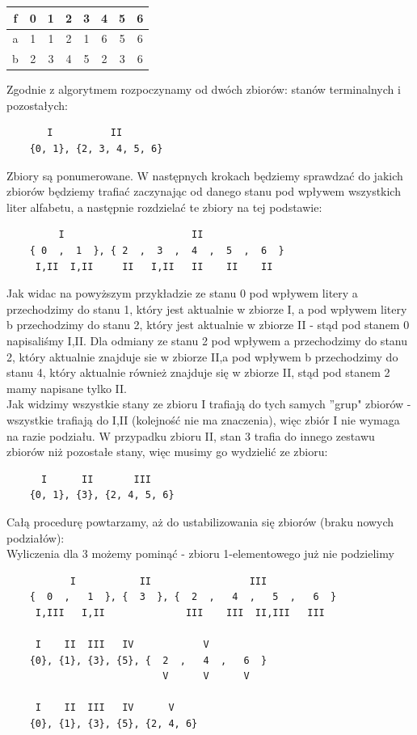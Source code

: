 \documentclass[12pt]{article}
\begin{document}
	\begin{table}[H]
	\centering
	\begin{tabular}{|c|c|c|c|c|c|c|c|}
	\hline
	f & 0 & 1 & 2 & 3 & 4 & 5 & 6 \\ \hline
	a & 1 & 1 & 2 & 1 & 6 & 5 & 6 \\ \hline
	b & 2 & 3 & 4 & 5 & 2 & 3 & 6 \\ \hline
	\end{tabular}
	\end{table}

	\noindent Zgodnie z algorytmem rozpoczynamy od dwóch zbiorów: stanów terminalnych i pozostałych:
	\begin{verbatim}
	   I          II
	{0, 1}, {2, 3, 4, 5, 6}
	\end{verbatim}

	\noindent Zbiory są ponumerowane. W następnych krokach będziemy sprawdzać do jakich zbiorów będziemy trafiać zaczynając od danego stanu pod wpływem wszystkich liter alfabetu,
	a następnie rozdzielać te zbiory na tej podstawie:
	\begin{verbatim}
	     I                      II
	{ 0  ,  1  }, { 2  ,  3  ,  4  ,  5  ,  6  }
	 I,II  I,II     II   I,II   II    II    II
	\end{verbatim}

	\noindent Jak widac na powyższym przykładzie ze stanu 0 pod wpływem litery a przechodzimy do stanu 1, który jest aktualnie w zbiorze I,
	a pod wpływem litery b przechodzimy do stanu 2, który jest aktualnie w zbiorze II - stąd pod stanem 0 napisaliśmy I,II.
	Dla odmiany ze stanu 2 pod wpływem a przechodzimy do stanu 2, który aktualnie znajduje sie w zbiorze II,a pod wpływem b przechodzimy do stanu 4,
	który aktualnie również znajduje się w zbiorze II, stąd pod stanem 2 mamy napisane tylko II. \\

	\noindent Jak widzimy wszystkie stany ze zbioru I trafiają do tych samych ''grup" zbiorów - wszystkie trafiają do I,II (kolejność nie ma znaczenia),
	więc zbiór I nie wymaga na razie podziału. W przypadku zbioru II, stan 3 trafia do innego zestawu zbiorów niż pozostałe stany, więc musimy go wydzielić ze zbioru:
	\begin{verbatim}
	  I      II       III
	{0, 1}, {3}, {2, 4, 5, 6}
	\end{verbatim}

	\noindent Całą procedurę powtarzamy, aż do ustabilizowania się zbiorów (braku nowych podziałów): \\
	\noindent Wyliczenia dla 3 możemy pominąć - zbioru 1-elementowego już nie podzielimy
	\begin{verbatim}
	       I           II                 III
	{  0  ,   1  }, {  3  }, {  2  ,   4  ,   5  ,   6  }
	 I,III   I,II              III    III  II,III   III

	 I    II  III   IV            V
	{0}, {1}, {3}, {5}, {  2  ,   4  ,   6  }
	                       V      V      V

	 I    II  III   IV      V
	{0}, {1}, {3}, {5}, {2, 4, 6}
	\end{verbatim}
	
\end{document}
